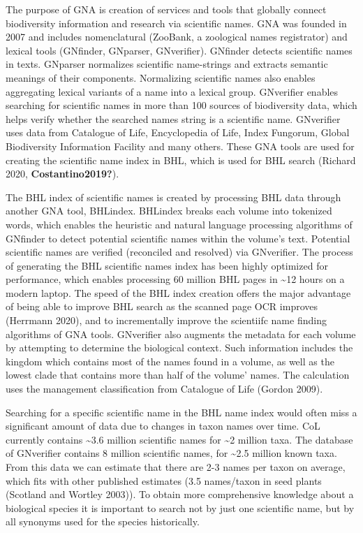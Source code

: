 \documentclass[
]{article}
\begin{document}
The purpose of GNA is creation of services and tools that globally
connect biodiversity information and research via scientific names. GNA
was founded in 2007 and includes nomenclatural (ZooBank, a zoological
names registrator) and lexical tools (GNfinder, GNparser, GNverifier).
GNfinder detects scientific names in texts. GNparser normalizes
scientific name-strings and extracts semantic meanings of their
components. Normalizing scientific names also enables aggregating
lexical variants of a name into a lexical group. GNverifier enables
searching for scientific names in more than 100 sources of biodiversity
data, which helps verify whether the searched names string is a
scientific name. GNverifier uses data from Catalogue of Life,
Encyclopedia of Life, Index Fungorum, Global Biodiversity Information
Facility and many others. These GNA tools are used for creating the
scientific name index in BHL, which is used for BHL search (Richard
2020, \textbf{Costantino2019?}).

The BHL index of scientific names is created by processing BHL data
through another GNA tool, BHLindex. BHLindex breaks each volume into
tokenized words, which enables the heuristic and natural language
processing algorithms of GNfinder to detect potential scientific names
within the volume's text. Potential scientific names are verified
(reconciled and resolved) via GNverifier. The process of generating the
BHL scientific names index has been highly optimized for performance,
which enables processing 60 million BHL pages in \textasciitilde12 hours
on a modern laptop. The speed of the BHL index creation offers the major
advantage of being able to improve BHL search as the scanned page OCR
improves (Herrmann 2020), and to incrementally improve the scientiifc
name finding algorithms of GNA tools. GNverifier also augments the
metadata for each volume by attempting to determine the biological
context. Such information includes the kingdom which contains most of
the names found in a volume, as well as the lowest clade that contains
more than half of the volume' names. The calculation uses the management
classification from Catalogue of Life (Gordon 2009).

Searching for a specific scientific name in the BHL name index would
often miss a significant amount of data due to changes in taxon names
over time. CoL currently contains \textasciitilde3.6 million scientific
names for \textasciitilde2 million taxa. The database of GNverifier
contains 8 million scientific names, for \textasciitilde2.5 million
known taxa. From this data we can estimate that there are 2-3 names per
taxon on average, which fits with other published estimates (3.5
names/taxon in seed plants (Scotland and Wortley 2003)). To obtain more
comprehensive knowledge about a biological species it is important to
search not by just one scientific name, but by all synonyms used for the
species historically.
\end{document}
